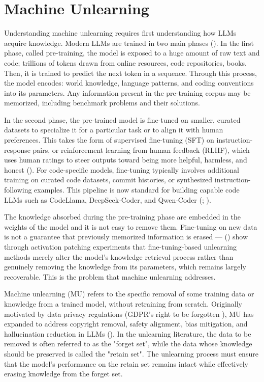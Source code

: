 \documentclass[mscthesis]{usiinfthesis}
\begin{document}
\section{Machine Unlearning}
Understanding machine unlearning requires first understanding how LLMs acquire knowledge. Modern LLMs are trained in two main phases (\citet{brown2020languagemodelsfewshotlearners}).  In the first phase, called pre-training, the model is exposed to a huge amount of raw text and code; trillions of tokens drawn from online resources, code repositories, books. Then, it is trained to predict the next token in a sequence. Through this process, the model encodes: world knowledge, language patterns, and coding conventions into its parameters. Any information present in the pre-training corpus may be memorized, including benchmark problems and their solutions. 
\par\vspace{1em}
In the second phase, the pre-trained model is fine-tuned on smaller, curated datasets to specialize it for a particular task or to align it with human preferences. This takes the form of supervised fine-tuning (SFT) on instruction-response pairs, or reinforcement learning from human feedback (RLHF), which uses human ratings to steer outputs toward being more helpful, harmless, and honest (\citet{ouyang2022traininglanguagemodelsfollow}). For code-specific models, fine-tuning typically involves additional training on curated code datasets, commit histories, or synthesized instruction-following examples. This pipeline is now standard for building capable code LLMs such as CodeLlama, DeepSeek-Coder, and Qwen-Coder (\citet{rozière2024codellamaopenfoundation}; \citet{hui2024qwen25codertechnicalreport}). 
\par\vspace{1em}
The knowledge absorbed during the pre-training phase are embedded in the weights of the model and it is not easy to remove them.
Fine-tuning on new data is not a  guarantee that previously memorized information is erased — (\citet{hong2024dissectingfinetuningunlearninglarge}) show through activation patching experiments that fine-tuning-based unlearning methods merely alter the model's knowledge retrieval process rather than genuinely removing the knowledge from its parameters, which remains largely recoverable. This is the problem that machine unlearning addresses.
\par\vspace{1em}
Machine unlearning (MU) refers to the specific removal of some training data or knowledge from a trained model, without retraining from scratch. Originally motivated by data privacy regulations (GDPR's right to be forgotten \citet{7163042}), MU has expanded to address copyright removal, safety alignment, bias mitigation, and hallucination reduction in LLMs (\citet{liu2024rethinkingmachineunlearninglarge}). In the unlearning literature, the data to be removed is often referred to as the "forget set", while the data whose knowledge should be preserved is called the "retain set". The unlearning process must ensure that the model's performance on the retain set remains intact while effectively erasing knowledge from the forget set.
\end{document}
